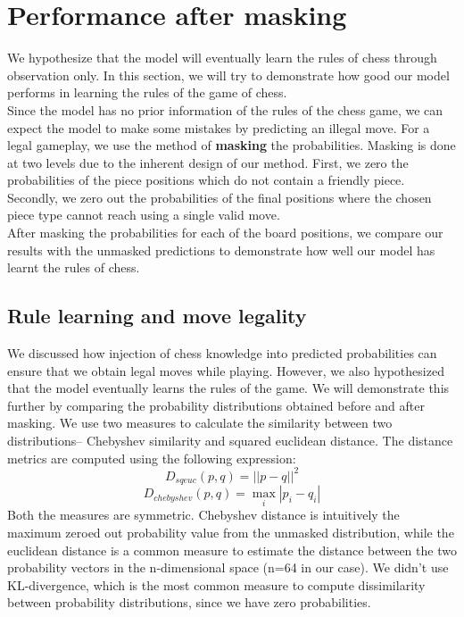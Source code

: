 \section{Performance after masking}
\label{sec:masking}
We hypothesize that the model will eventually learn the rules of chess through 
observation only. In this section, we will try to demonstrate how good our model 
performs in learning the rules of the game of chess.\\

Since the model has no prior information of the rules of the chess game, we can 
expect the model to make some mistakes by predicting an illegal move. For a 
legal gameplay, we use the method of \textbf{masking} the probabilities. Masking 
is done at two levels due to the inherent design of our method. First, we zero 
the probabilities of the piece positions which do not contain a friendly piece. 
Secondly, we zero out the probabilities of the final positions where the chosen 
piece type cannot reach using a single valid move.\\

After masking the probabilities for each of the board positions, we compare 
our results with the unmasked predictions to demonstrate how well our model 
has learnt the rules of chess.

\subsection{Rule learning and move legality}
We discussed how injection of chess knowledge into predicted probabilities can 
ensure that we obtain legal moves while playing. However, we also 
hypothesized that the model eventually learns the rules of the game. We will 
demonstrate this further by comparing the probability distributions obtained 
before and after masking. We use two measures to calculate the similarity 
between two distributions-- Chebyshev similarity and squared euclidean 
distance. The 
distance metrics are computed using the following expression:
\[D_{sqeuc}(p,q) = ||p-q||^2\]
\[D_{chebyshev}(p,q) = \max_{i}|p_i-q_i|\]
Both the measures are symmetric. Chebyshev distance is intuitively the maximum 
zeroed out probability value from the unmasked distribution, while the 
euclidean distance is a common measure to estimate the distance between the two 
probability vectors in the n-dimensional space (n=64 in our case). We didn't 
use KL-divergence, which is the most common measure to compute dissimilarity 
between probability distributions, since we have zero probabilities.\\

